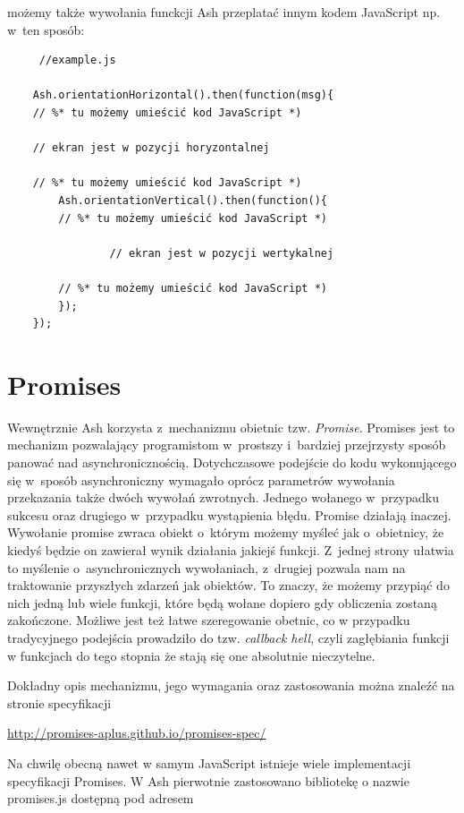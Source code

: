 \documentclass[brudnopis]{xmgr}
\begin{document}
możemy także wywołania funckcji Ash przeplatać innym kodem JavaScript np. w~ten sposób:

\begin{lstlisting}
     //example.js

    Ash.orientationHorizontal().then(function(msg){
	// %* tu możemy umieścić kod JavaScript *)
      	
	// ekran jest w pozycji horyzontalnej
      
	// %* tu możemy umieścić kod JavaScript *)
      	Ash.orientationVertical().then(function(){
		// %* tu możemy umieścić kod JavaScript *)

        		// ekran jest w pozycji wertykalnej 

		// %* tu możemy umieścić kod JavaScript *)
      	});
    });
\end{lstlisting}

\section{Promises}

Wewnętrznie Ash korzysta z~mechanizmu obietnic tzw. \textit{Promise}. Promises jest to mechanizm pozwalający programistom w~prostszy i~bardziej przejrzysty sposób panować nad asynchronicznością. Dotychczasowe podejście do kodu wykonującego się w~sposób asynchroniczny wymagało oprócz parametrów wywołania przekazania także dwóch wywołań zwrotnych. Jednego wołanego w~przypadku sukcesu oraz drugiego w~przypadku wystąpienia błędu. Promise działają inaczej. Wywołanie promise zwraca obiekt o~którym możemy myśleć jak o~obietnicy, że kiedyś będzie on zawierał wynik działania jakiejś funkcji. Z~jednej strony ułatwia to myślenie o~asynchronicznych wywołaniach, z~drugiej pozwala nam na traktowanie przyszłych zdarzeń jak obiektów. To znaczy, że możemy przypiąć do nich jedną lub wiele funkcji, które będą wołane dopiero gdy obliczenia zostaną zakończone. Możliwe jest też łatwe szeregowanie obetnic, co w przypadku tradycyjnego podejścia prowadziło do tzw. \textit{callback hell}, czyli zagłębiania funkcji w funkcjach do tego stopnia że stają się one absolutnie nieczytelne. 

Dokładny opis mechanizmu, jego wymagania oraz zastosowania można znaleźć na  stronie specyfikacji

\url{http://promises-aplus.github.io/promises-spec/}

Na chwilę obecną nawet w samym JavaScript istnieje wiele implementacji specyfikacji Promises. W Ash pierwotnie zastosowano bibliotekę o nazwie promises.js dostępną pod adresem
\end{document}
